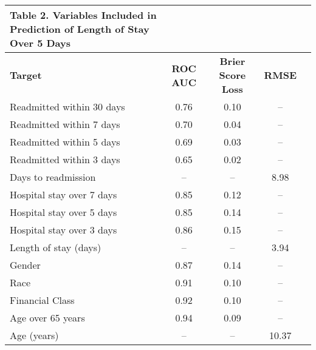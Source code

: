 \begin{adjustbox}{width={\textwidth},keepaspectratio,frame}%
{
\begin{tabular}{lcccc}
\rowcolor{NEJMTopRow} \multicolumn{2}{l}
{{\textbf{\color{NEJMRed} Table 2.}}
\textbf{Variables Included in Prediction of Length of Stay Over 5 Days}} 
\\
\hline
\textbf{Target} & \textbf{ROC AUC} & \textbf{Brier Score Loss} &   \textbf{RMSE} \\
Readmitted within 30 days &    0.76 &              0.10 &        -- \\
Readmitted within 7 days  &    0.70 &              0.04 &        -- \\
Readmitted within 5 days  &    0.69 &              0.03 &        -- \\
Readmitted within 3 days  &    0.65 &              0.02 &        -- \\
Days to readmission       &      -- &                -- &      8.98 \\
Hospital stay over 7 days &    0.85 &              0.12 &        -- \\
Hospital stay over 5 days &    0.85 &              0.14 &        -- \\
Hospital stay over 3 days &    0.86 &              0.15 &        -- \\
Length of stay (days)     &      -- &                -- &      3.94 \\
Gender                    &    0.87 &              0.14 &        -- \\
Race                      &    0.91 &              0.10 &        -- \\
Financial Class           &    0.92 &              0.10 &        -- \\
Age over 65 years         &    0.94 &              0.09 &        -- \\
Age (years)               &      -- &                -- &     10.37 \\
\end{tabular}
\label{table:tablelos}
}
\end{adjustbox}
